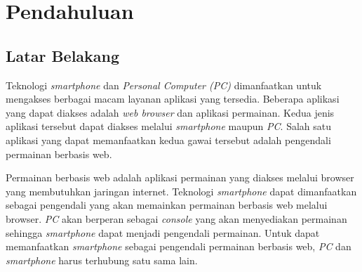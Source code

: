 \chapter{Pendahuluan}
\label{chap:intro}
   
\section{Latar Belakang}
\label{sec:label}



Teknologi \textit{smartphone} dan \textit{Personal Computer (PC)} dimanfaatkan untuk mengakses berbagai macam layanan aplikasi yang tersedia. Beberapa aplikasi yang dapat diakses adalah \textit{web browser} dan aplikasi permainan. Kedua jenis aplikasi tersebut dapat diakses melalui \textit{smartphone} maupun \textit{PC}. Salah satu aplikasi yang dapat memanfaatkan kedua gawai tersebut adalah pengendali permainan berbasis web.

Permainan berbasis web adalah aplikasi permainan yang diakses melalui browser yang membutuhkan jaringan internet. Teknologi \textit{smartphone} dapat dimanfaatkan sebagai pengendali yang akan memainkan permainan berbasis web melalui browser. \textit{PC} akan berperan sebagai \textit{console} yang akan menyediakan permainan sehingga \textit{smartphone} dapat menjadi pengendali permainan. Untuk dapat memanfaatkan \textit{smartphone} sebagai pengendali permainan berbasis web, \textit{PC} dan \textit{smartphone} harus terhubung satu sama lain. 

